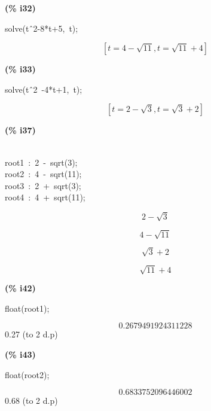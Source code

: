 \documentclass[fleqn]{article}
\begin{document}
\noindent
\begin{minipage}[t]{4.000000em}\color{red}\bfseries
(\% i32)	
\end{minipage}
\begin{minipage}[t]{\textwidth}\color{blue}
solve(t\^\ 2-8*t+5,\ t);
\end{minipage}
\[\displaystyle \tag{\% o32} 
\left[ t\mathop{=}4\mathop{-}\sqrt{11}\mathop{,}t\mathop{=}\sqrt{11}\mathop{+}4\right] \mbox{}
\]


\noindent
\begin{minipage}[t]{4.000000em}\color{red}\bfseries
(\% i33)	
\end{minipage}
\begin{minipage}[t]{\textwidth}\color{blue}
solve(t\^\ 2\ -4*t+1,\ t);
\end{minipage}
\[\displaystyle \tag{\% o33} 
\left[ t\mathop{=}2\mathop{-}\sqrt{3}\mathop{,}t\mathop{=}\sqrt{3}\mathop{+}2\right] \mbox{}
\]


\noindent
\begin{minipage}[t]{4.000000em}\color{red}\bfseries
(\% i37)	
\end{minipage}
\begin{minipage}[t]{\textwidth}\color{blue}
\\
root1\ :\ 2\ -\ sqrt(3);\\
root2\ :\ 4\ -\ sqrt(11);\\
root3\ :\ 2\ +\ sqrt(3);\\
root4\ :\ 4\ +\ sqrt(11);
\end{minipage}
\[\displaystyle \tag{root1} 
2\mathop{-}\sqrt{3}\mbox{}\]

\[\tag{root2} 
4\mathop{-}\sqrt{11}\mbox{}\]

\[\tag{root3} 
\sqrt{3}\mathop{+}2
\mbox{}\]

\[\tag{root4} 
\sqrt{11}\mathop{+}4\mbox{}
\]


\noindent
\begin{minipage}[t]{4.000000em}\color{red}\bfseries
(\% i42)	
\end{minipage}
\begin{minipage}[t]{\textwidth}\color{blue}
float(root1);
\end{minipage}
\[\displaystyle \tag{\% o42} 
0.2679491924311228\mbox{}
\]
0.27 (to 2 d.p)


\noindent
\begin{minipage}[t]{4.000000em}\color{red}\bfseries
(\% i43)	
\end{minipage}
\begin{minipage}[t]{\textwidth}\color{blue}
float(root2);
\end{minipage}
\[\displaystyle \tag{\% o43} 
0.6833752096446002\mbox{}
\]
0.68 (to 2 d.p)
\end{document}
